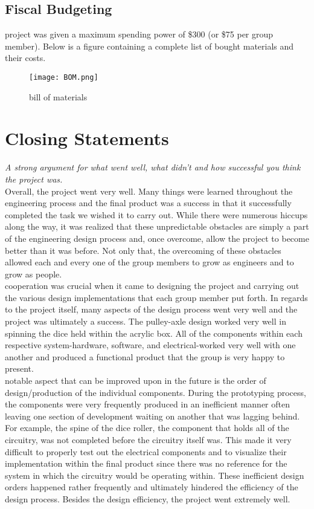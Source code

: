 \documentclass[12pt]{article}
\begin{document}
\subsection{Fiscal Budgeting}
 project was given a maximum spending power of \$300 (or \$75 per group member). Below is a figure containing a complete list of bought materials and their costs.
\begin{figure}[H]
\centering
    \texttt{[image: BOM.png]}
    \caption{bill of materials}
    \label{fig:sub8}
\end{figure}
\newpage
\section{Closing Statements}
\textit{A strong argument for what went well, what didn't and how successful you think the project was.}\\

Overall, the project went very well. Many things were learned throughout the engineering process and the final product was a success in that it successfully completed the task we wished it to carry out. While there were numerous hiccups along the way, it was realized that these unpredictable obstacles are simply a part of the engineering design process and, once overcome, allow the project to become better than it was before. Not only that, the overcoming of these obstacles allowed each and every one of the group members to grow as engineers and to grow as people.\\
 cooperation was crucial when it came to designing the project and carrying out the various design implementations that each group member put forth. In regards to the project itself, many aspects of the design process went very well and the project was ultimately a success. The pulley-axle design worked very well in spinning the dice held within the acrylic box. All of the components within each respective system-hardware, software, and electrical-worked very well with one another and produced a functional product that the group is very happy to present. \\
 notable aspect that can be improved upon in the future is the order of design/production of the individual components. During the prototyping process, the components were very frequently produced in an inefficient manner often leaving one section of development waiting on another that was lagging behind. For example, the spine of the dice roller, the component that holds all of the circuitry, was not completed before the circuitry itself was. This made it very difficult to properly test out the electrical components and to visualize their implementation within the final product since there was no reference for the system in which the circuitry would be operating within. These inefficient design orders happened rather frequently and ultimately hindered the efficiency of the design process. Besides the design efficiency, the project went extremely well.

\end{document}
